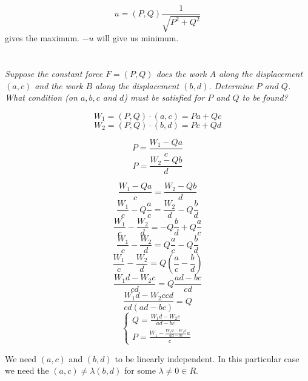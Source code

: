 \documentclass[11pt,oneside,titlepage]{book}
\begin{document}
$$u = (P, Q) \frac{1}{\sqrt{P^2 + Q^2}}$$
gives the maximum. $-u$ will give us minimum.

\section{}

\textit{Suppose the constant force $F = (P, Q)$ does the work $A$ along the displacement
  $(a, c)$ and the work $B$ along the displacement $(b, d)$. Determine $P$ and $Q$. What
  condition (on $a, b, c$ and $d$) must be satisfied for $P$ and $Q$ to be found?}

$$W_1 = (P, Q) \cdot (a, c) = Pa + Qc$$
$$W_2 = (P, Q) \cdot (b, d) = Pc + Qd$$

$$P = \frac{W_1 - Qa}{c}$$
$$P = \frac{W_2 - Qb}{d}$$

$$\frac{W_1 - Qa}{c} = \frac{W_2 - Qb}{d}$$
$$\frac{W_1}{c} - Q \frac{a}{ c} = \frac{W_2}{d} - Q\frac{b}{d}$$
$$\frac{W_1}{c} - \frac{W_2}{d}  =  - Q\frac{b}{d} + Q \frac{a}{ c}$$
$$\frac{W_1}{c} - \frac{W_2}{d}  =   Q \frac{a}{ c} - Q\frac{b}{d} $$
$$\frac{W_1}{c} - \frac{W_2}{d}  =   Q \left( \frac{a}{ c} - \frac{b}{d} \right) $$
$$\frac{W_1 d - W_2 c}{cd}  =   Q  \frac{ad - bc }{ cd} $$
$$\frac{W_1 d - W_2 c cd}{cd (ad - bc)}  =   Q   $$
$$
\begin{cases}
  Q = \frac{W_1 d - W_2 c }{ad - bc} \\
  P = \frac{W_1 - \frac{W_1 d - W_2 c }{ad - bc} a}{c}
\end{cases}
$$

We need $(a, c)$ and $(b, d)$ to be linearly independent. In this particular case we need
the $(a, c) \neq \lambda (b, d)$ for some $\lambda \neq 0 \in R$.
\end{document}
